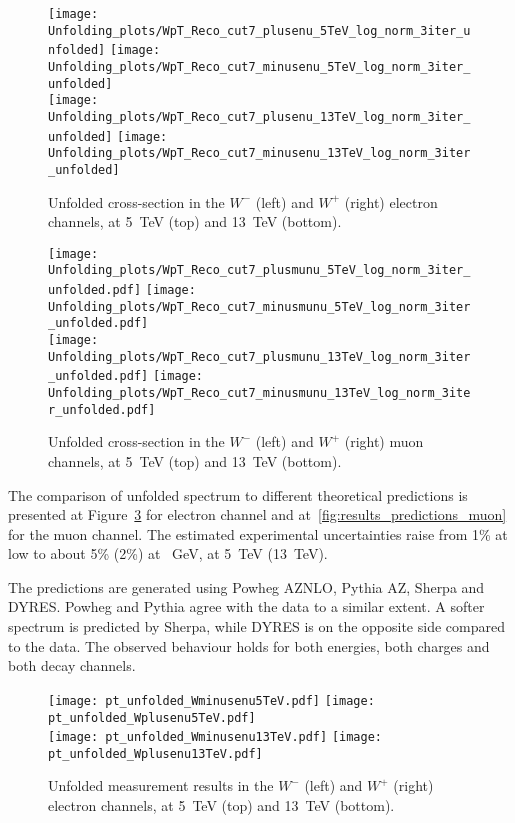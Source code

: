 \begin{figure}[h]
	\centering
	{\texttt{[image: Unfolding\_plots/WpT\_Reco\_cut7\_plusenu\_5TeV\_log\_norm\_3iter\_unfolded]}}
	{\texttt{[image: Unfolding\_plots/WpT\_Reco\_cut7\_minusenu\_5TeV\_log\_norm\_3iter\_unfolded]}} \\
	{\texttt{[image: Unfolding\_plots/WpT\_Reco\_cut7\_plusenu\_13TeV\_log\_norm\_3iter\_unfolded]}}
	{\texttt{[image: Unfolding\_plots/WpT\_Reco\_cut7\_minusenu\_13TeV\_log\_norm\_3iter\_unfolded]}}
	\caption{Unfolded cross-section in the $W^-$ (left) and $W^+$ (right) electron channels, at 5~TeV (top) and 13~TeV (bottom).}
	\label{fig:results_cross_sec_elec}
\end{figure}

\begin{figure}[h]
	\centering
	{\texttt{[image: Unfolding\_plots/WpT\_Reco\_cut7\_plusmunu\_5TeV\_log\_norm\_3iter\_unfolded.pdf]}}
	{\texttt{[image: Unfolding\_plots/WpT\_Reco\_cut7\_minusmunu\_5TeV\_log\_norm\_3iter\_unfolded.pdf]}} \\
	{\texttt{[image: Unfolding\_plots/WpT\_Reco\_cut7\_plusmunu\_13TeV\_log\_norm\_3iter\_unfolded.pdf]}}
	{\texttt{[image: Unfolding\_plots/WpT\_Reco\_cut7\_minusmunu\_13TeV\_log\_norm\_3iter\_unfolded.pdf]}}
	\caption{Unfolded cross-section in the $W^-$ (left) and $W^+$ (right) muon channels, at 5~TeV (top) and 13~TeV (bottom).}
	\label{fig:results_cross_sec_muon}
\end{figure}


The comparison of unfolded spectrum to different theoretical predictions is presented at Figure~\ref{fig:results_predictions_elec} for electron channel and at~\ref{fig:results_predictions_muon} for the muon channel. The estimated experimental uncertainties raise from 1\% at low \ptw to about 5\% (2\%) at ~GeV, at 5~TeV (13~TeV).

The predictions are generated using Powheg AZNLO, Pythia AZ, Sherpa and DYRES. Powheg and Pythia agree with the data to a similar extent. A softer spectrum is predicted by Sherpa, while DYRES is on the opposite side compared to the data. The observed behaviour holds for both energies, both charges and both decay channels.

\begin{figure}[h]
	\centering
	{\texttt{[image: pt\_unfolded\_Wminusenu5TeV.pdf]}}
	{\texttt{[image: pt\_unfolded\_Wplusenu5TeV.pdf]}} \\
	{\texttt{[image: pt\_unfolded\_Wminusenu13TeV.pdf]}}
	{\texttt{[image: pt\_unfolded\_Wplusenu13TeV.pdf]}}
	\caption{Unfolded measurement results in the $W^-$ (left) and $W^+$ (right) electron channels, at 5~TeV (top) and 13~TeV (bottom).}
	\label{fig:results_predictions_elec}
\end{figure}

